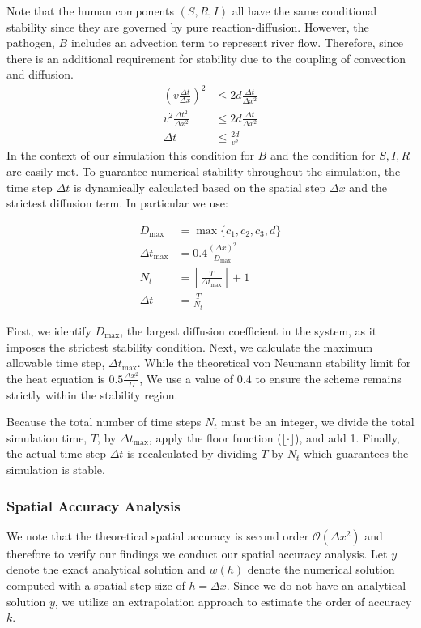 Note that the human components $(S, R, I)$ all have the same conditional stability since they are governed by pure reaction-diffusion. However, the pathogen, $B$ includes an advection term to represent river flow. Therefore, since there is an additional requirement for stability due to the coupling of convection and diffusion. 
\begin{align}
    (v \frac{\Delta t}{\Delta x})^2 &\leq 2 d \frac{\Delta t}{\Delta x^2} \\
    v^2 \frac{\Delta t^2}{\Delta x^2}& \leq 2d \frac{\Delta t}{\Delta x^2} \\
    \Delta t & \leq \frac{2d}{v^2}
\end{align}
In the context of our simulation this condition for $B$ and the condition for $S,I,R$ are easily met. To guarantee numerical stability throughout the simulation, the time step $\Delta t$ is dynamically calculated based on the spatial step $\Delta x$ and the strictest diffusion term. In particular we use: 

\begin{align}
    D_{\max} &= \max \{ c_1, c_2, c_3, d \} \\[6pt]
    \Delta t_{\max} &= 0.4 \frac{(\Delta x)^2}{D_{\max}} \\[6pt]
    N_t &= \left\lfloor \frac{T}{\Delta t_{\max}} \right\rfloor + 1 \\[6pt]
    \Delta t &= \frac{T}{N_t}
\end{align}

First, we identify $D_{\max}$, the largest diffusion coefficient in the system, as it imposes the strictest stability condition. Next, we calculate the maximum allowable time step, $\Delta t_{\max}$. While the theoretical von Neumann stability limit for the heat equation is $0.5 \frac{\Delta x^2}{D}$, We use a value  of $0.4$ to ensure the scheme remains strictly within the stability region. 

Because the total number of time steps $N_t$ must be an integer, we divide the total simulation time, $T$, by $\Delta t_{\max}$, apply the floor function ($\lfloor \cdot \rfloor$), and add 1. Finally, the actual time step $\Delta t$ is recalculated by dividing $T$ by $N_t$ which guarantees the simulation is stable. 

\subsubsection{Spatial Accuracy Analysis}
We note that the theoretical spatial accuracy is second order $\mathcal{O}(\Delta x^2)$ and therefore to verify our findings we conduct our spatial accuracy analysis. Let $y$ denote the exact analytical solution and $w(h)$ denote the numerical solution computed with a spatial step size of $h = \Delta x$. Since we do not have an analytical solution $y$, we utilize an extrapolation approach to estimate the order of accuracy $k$.


